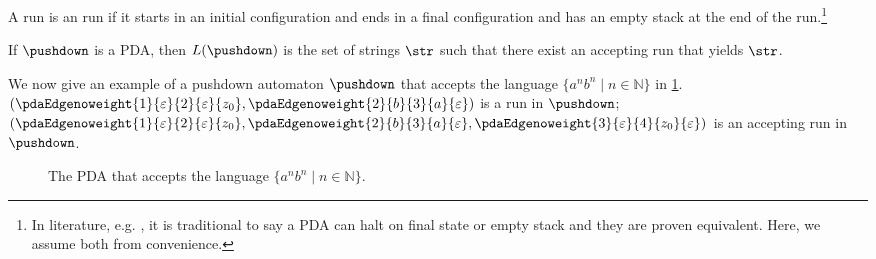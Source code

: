 \begin{definition}
A run is an  run if it starts in an initial configuration and ends in a final configuration and has an empty stack at the end of the run.\footnote{In literature, e.g. \cite{sipser1996computation}, it is traditional to say a PDA can halt on final state or empty stack and they are proven equivalent. Here, we assume both from convenience.}
\end{definition}

\begin{definition}
If $\pushdown$ is a PDA, then $L(\pushdown)$ is the set of strings $\str$ such that there exist an accepting run that yields $\str$. 
\end{definition}

\begin{example}
We now give an example of a pushdown automaton $\pushdown$ that accepts the language $\{a^n b^n \mid n \in \mathbb{N}\}$ in \cref{fig:pda_example}. $\left( \pdaEdgenoweight{1}{\varepsilon}{2}{\varepsilon}{z_0},  \pdaEdgenoweight{2}{b}{3}{a}{\varepsilon} \right) $ is a run in $\pushdown$; $\left(\pdaEdgenoweight{1}{\varepsilon}{2}{\varepsilon}{z_0},  \pdaEdgenoweight{2}{b}{3}{a}{\varepsilon}, \pdaEdgenoweight{3}{\varepsilon}{4}{z_0}{\varepsilon} \right) $ is an accepting run in $\pushdown$.
\end{example}
\begin{figure}[ht] 
\centering
\caption{The PDA that accepts the language $\{a^n b^n \mid n \in \mathbb{N}\}$.}
\label{fig:pda_example}
\end{figure}




